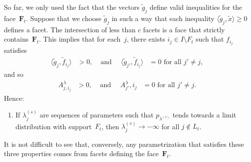 \documentclass[aos,noinfoline]{imsart}
\def\<{\langle}
\def\>{\rangle}
\newcommand{\Fbf}{\mathbf{F}}
\theoremstyle{remark}
\theoremstyle{definition}
\begin{document}
So far, we only used the fact that the vectors $\tilde g_{j}$ define valid inequalities for the face~$\Fbf_{t}$.
Suppose that we choose $\tilde g_{j}$ in such a way that each inequality $\<\tilde g_{j},\tilde x\>\ge 0$ defines a
facet.  The intersection of less than $c$ facets is a face that strictly contains~$\Fbf_{t}$.  This implies that for
each~$j$, there exists $i_{j}\in I\setminus F_{t}$ such that $f_{i_{j}}$ satisfies
\begin{align*}
  \<\tilde g_{j}, \tilde f_{i_{j}}\> & > 0, & \text{ and }\quad
  \<\tilde g_{j'}, \tilde f_{i_{j}}\> & = 0 \text{ for all }j'\neq j,
\end{align*}
and so
\begin{align*}
  A^{\lambda}_{j,i_{j}} & > 0, & \text{ and }\quad
  A^{\lambda}_{j'},i_{j} & = 0 \text{ for all }j'\neq j.
\end{align*}
Hence:
\begin{enumerate}[resume]
\item If $\lambda^{(s)}_{j}$ are sequences of parameters such that $p_{\lambda^{(s)}}$ tends towards a limit
  distribution with support~$F_{t}$, then $\lambda^{(s)}_{j}\to-\infty$ for all $j\notin L_{t}$.
\end{enumerate}

It is not difficult to see that, conversely, any parametrization that satisfies these three properties comes from facets
defining the face~$\Fbf_{t}$.
\end{document}
